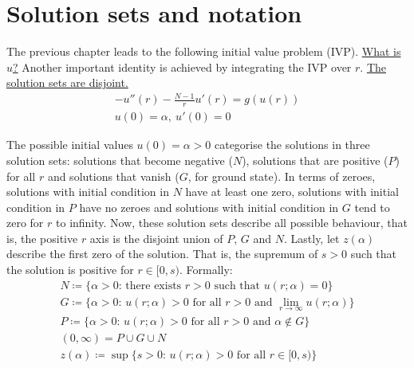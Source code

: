 \section{Solution sets and notation}\label{not}
The previous chapter leads to the following initial value problem (IVP). \underline{What is $u$?} Another important identity is achieved by integrating the IVP over $r$. \underline{The solution sets are disjoint.}
\begin{gather*}-u''(r)-\frac{N-1}{r}u'(r)=g(u(r))\tag{IVP}\label{ivp}\\ u(0)=\alpha,~u'(0)=0\end{gather*}
\begin{equation}\label{ivpint}
\end{equation}

The possible initial values $u(0)=\alpha>0$ categorise the solutions in three solution sets: solutions that become negative ($N$), solutions that are positive ($P$) for all $r$ and solutions that vanish ($G$, for ground state). In terms of zeroes, solutions with initial condition in $N$ have at least one zero, solutions with initial condition in $P$ have no zeroes and solutions with initial condition in $G$ tend to zero for $r$ to infinity. Now, these solution sets describe all possible behaviour, that is, the positive $r$ axis is the disjoint union of $P$, $G$ and $N$. Lastly, let $z(\alpha)$ describe the first zero of the solution. That is, the supremum of $s>0$ such that the solution is positive for $r\in[0,s)$. Formally:
\setlength{\jot}{1em}
\\\begin{gather*}
  N \coloneqq \text{\{$\alpha>0$: there exists $r>0$ such that $u(r;\alpha)=0$\}} \\
  G \coloneqq \text{\{$\alpha>0$: $u(r;\alpha)>0$ for all $r>0$ and $\underset{r\to\infty}{\lim}u(r;\alpha)$\}} \\
  P \coloneqq \text{\{$\alpha>0$: $u(r;\alpha)>0$ for all $r>0$ and $\alpha\notin G$\}}\\
  (0,\infty) = P\cup G\cup N\\
  z(\alpha) \coloneqq \text{$\sup\{s>0$: $u(r;\alpha)>0$ for all $r\in[0,s)$\}}
\end{gather*}
